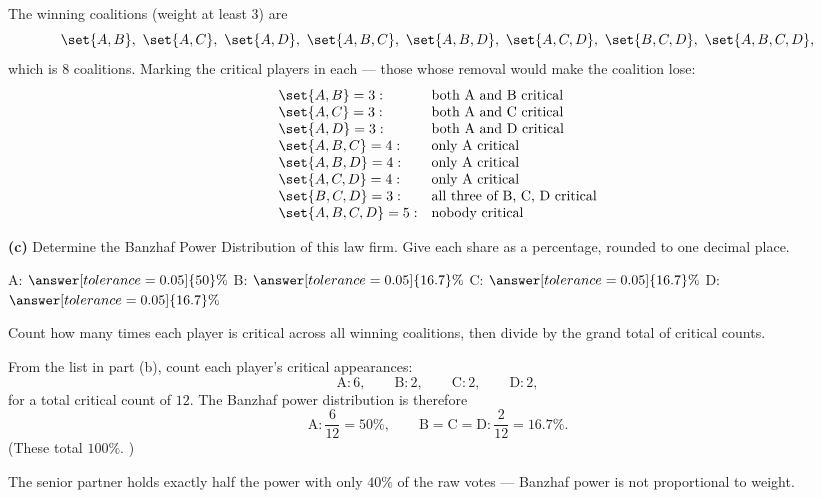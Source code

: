 \documentclass[12pt]{ximera}
\begin{document}
\begin{problem}
\begin{prompt}
\begin{feedback}
The winning coalitions (weight at least $3$) are
\[
\set{A,B},\ \set{A,C},\ \set{A,D},\ \set{A,B,C},\ \set{A,B,D},\ \set{A,C,D},\
\set{B,C,D},\ \set{A,B,C,D},
\]
which is $8$ coalitions. Marking the critical players in each --- those whose removal
would make the coalition lose:
\[
\begin{array}{ll}
\set{A,B}=3: & \text{both A and B critical}\\
\set{A,C}=3: & \text{both A and C critical}\\
\set{A,D}=3: & \text{both A and D critical}\\
\set{A,B,C}=4: & \text{only A critical}\\
\set{A,B,D}=4: & \text{only A critical}\\
\set{A,C,D}=4: & \text{only A critical}\\
\set{B,C,D}=3: & \text{all three of B, C, D critical}\\
\set{A,B,C,D}=5: & \text{nobody critical}
\end{array}
\]
\end{feedback}
\end{prompt}

\begin{prompt}
\textbf{(c)} Determine the Banzhaf Power Distribution of this law firm. Give each
share as a percentage, rounded to one decimal place.

A: $\answer[tolerance=0.05]{50}\%$ \qquad
B: $\answer[tolerance=0.05]{16.7}\%$ \qquad
C: $\answer[tolerance=0.05]{16.7}\%$ \qquad
D: $\answer[tolerance=0.05]{16.7}\%$

\begin{hint}
Count how many times each player is critical across all winning coalitions, then
divide by the grand total of critical counts.
\end{hint}

\begin{feedback}
From the list in part (b), count each player's critical appearances:
\[
\text{A}: 6, \qquad \text{B}: 2, \qquad \text{C}: 2, \qquad \text{D}: 2,
\]
for a total critical count of $12$. The Banzhaf power distribution is therefore
\[
\text{A}: \frac{6}{12}=50\%, \qquad
\text{B}=\text{C}=\text{D}: \frac{2}{12}=16.7\%.
\]
(These total $100\%$. \checkmark)

The senior partner holds exactly half the power with only $40\%$ of the raw votes ---
Banzhaf power is not proportional to weight.
\end{feedback}
\end{prompt}
\end{problem}
\end{document}
